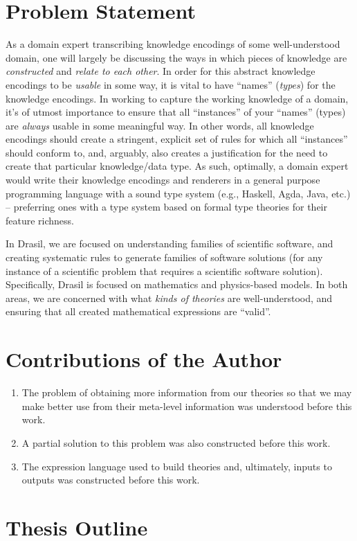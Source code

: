 

\section{Problem Statement}


As a domain expert transcribing knowledge encodings of some well-understood
domain, one will largely be discussing the ways in which pieces of knowledge are
\textit{constructed} and \textit{relate to each other}. In order for this
abstract knowledge encodings to be \textit{usable} in some way, it is vital to
have ``names'' (\textit{types}) for the knowledge encodings. In working to
capture the working knowledge of a domain, it's of utmost importance to ensure
that all ``instances'' of your ``names'' (types) are \textit{always} usable in
some meaningful way. In other words, all knowledge encodings should create a
stringent, explicit set of rules for which all ``instances'' should conform to,
and, arguably, also creates a justification for the need to create that
particular knowledge/data type. As such, optimally, a domain expert would write
their knowledge encodings and renderers in a general purpose programming
language with a sound type system (e.g., Haskell, Agda, Java, etc.) --
preferring ones with a type system based on formal type theories for their
feature richness.

In Drasil, we are focused on understanding families of scientific software, and
creating systematic rules to generate families of software solutions (for any
instance of a scientific problem that requires a scientific software solution).
Specifically, Drasil is focused on mathematics and physics-based models. In both
areas, we are concerned with what \textit{kinds of theories} are
well-understood, and ensuring that all created mathematical expressions are
``valid''. 

\section{Contributions of the Author}

\begin{enumerate}
    \item The problem of obtaining more information from our theories so that we
          may make better use from their meta-level information was understood
          before this work.
    \item A partial solution to this problem was also constructed before this
          work.
    \item The expression language used to build theories and, ultimately, inputs
          to outputs was constructed before this work.
\end{enumerate}

\section{Thesis Outline}

